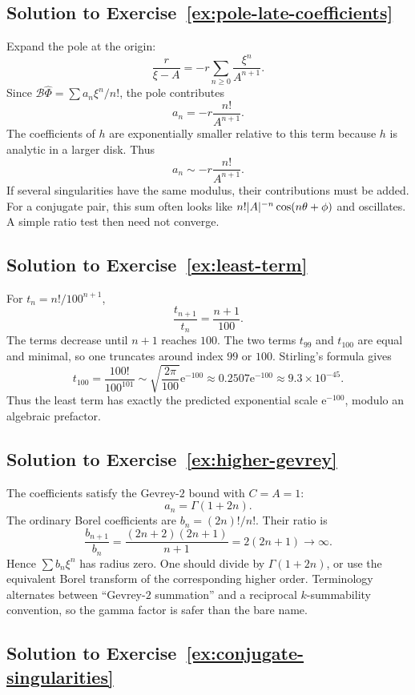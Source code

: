 \documentclass[11pt,oneside]{book}
\theoremstyle{definition}
\theoremstyle{remark}
\newcommand{\Borel}{\mathcal{B}}
\newcommand{\e}{\mathrm{e}}
\newcommand{\phihat}{\widehat{\Phi}}
\DeclarePairedDelimiter{\abs}{\lvert}{\rvert}
\begin{document}
\subsection*{Solution to Exercise~\ref{ex:pole-late-coefficients}}

Expand the pole at the origin:
\[
  \frac{r}{\xi-A}
  =-r\sum_{n\ge0}\frac{\xi^n}{A^{n+1}}.
\]
Since
$\Borel\phihat=\sum a_n\xi^n/n!$, the pole contributes
\[
  a_n=-r\frac{n!}{A^{n+1}}.
\]
The coefficients of $h$ are exponentially smaller relative to this term because
$h$ is analytic in a larger disk. Thus
\[
  a_n\sim-r\frac{n!}{A^{n+1}}.
\]
If several singularities have the same modulus, their contributions must be
added. For a conjugate pair, this sum often looks like
$n!\abs A^{-n}\cos(n\theta+\phi)$ and oscillates. A simple ratio test then need
not converge.

\subsection*{Solution to Exercise~\ref{ex:least-term}}

For
$t_n=n!/100^{n+1}$,
\[
  \frac{t_{n+1}}{t_n}=\frac{n+1}{100}.
\]
The terms decrease until $n+1$ reaches $100$. The two terms $t_{99}$ and
$t_{100}$ are equal and minimal, so one truncates around index $99$ or $100$.
Stirling's formula gives
\[
  t_{100}
  =\frac{100!}{100^{101}}
  \sim\sqrt{\frac{2\pi}{100}}\e^{-100}
  \approx0.2507\e^{-100}
  \approx9.3\times10^{-45}.
\]
Thus the least term has exactly the predicted exponential scale $\e^{-100}$,
modulo an algebraic prefactor.

\subsection*{Solution to Exercise~\ref{ex:higher-gevrey}}

The coefficients satisfy the Gevrey-$2$ bound with $C=A=1$:
\[
  a_n=\Gamma(1+2n).
\]
The ordinary Borel coefficients are
$b_n=(2n)!/n!$. Their ratio is
\[
  \frac{b_{n+1}}{b_n}
  =\frac{(2n+2)(2n+1)}{n+1}
  =2(2n+1)\to\infty.
\]
Hence $\sum b_n\xi^n$ has radius zero. One should divide by
$\Gamma(1+2n)$, or use the equivalent Borel transform of the corresponding
higher order. Terminology alternates between ``Gevrey-$2$ summation'' and a
reciprocal $k$-summability convention, so the gamma factor is safer than the
bare name.

\subsection*{Solution to Exercise~\ref{ex:conjugate-singularities}}
\end{document}
